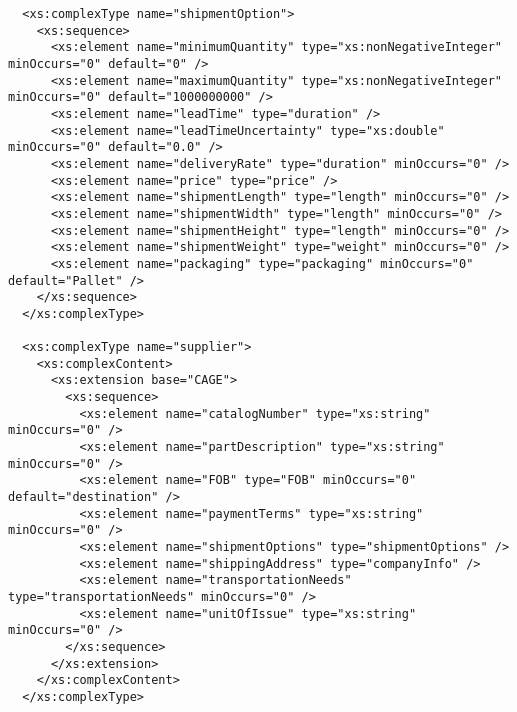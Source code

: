 \begin{lstlisting}
  <xs:complexType name="shipmentOption">
    <xs:sequence>
      <xs:element name="minimumQuantity" type="xs:nonNegativeInteger" minOccurs="0" default="0" />
      <xs:element name="maximumQuantity" type="xs:nonNegativeInteger" minOccurs="0" default="1000000000" />
      <xs:element name="leadTime" type="duration" />
      <xs:element name="leadTimeUncertainty" type="xs:double" minOccurs="0" default="0.0" />
      <xs:element name="deliveryRate" type="duration" minOccurs="0" />
      <xs:element name="price" type="price" />
      <xs:element name="shipmentLength" type="length" minOccurs="0" />
      <xs:element name="shipmentWidth" type="length" minOccurs="0" />
      <xs:element name="shipmentHeight" type="length" minOccurs="0" />
      <xs:element name="shipmentWeight" type="weight" minOccurs="0" />
      <xs:element name="packaging" type="packaging" minOccurs="0" default="Pallet" />
    </xs:sequence>
  </xs:complexType>

  <xs:complexType name="supplier">
    <xs:complexContent>
      <xs:extension base="CAGE">
        <xs:sequence>
          <xs:element name="catalogNumber" type="xs:string" minOccurs="0" />
          <xs:element name="partDescription" type="xs:string" minOccurs="0" />
          <xs:element name="FOB" type="FOB" minOccurs="0" default="destination" />
          <xs:element name="paymentTerms" type="xs:string" minOccurs="0" />
          <xs:element name="shipmentOptions" type="shipmentOptions" />
          <xs:element name="shippingAddress" type="companyInfo" />
          <xs:element name="transportationNeeds" type="transportationNeeds" minOccurs="0" />
          <xs:element name="unitOfIssue" type="xs:string" minOccurs="0" />
        </xs:sequence>
      </xs:extension>
    </xs:complexContent>
  </xs:complexType>


\end{lstlisting}
